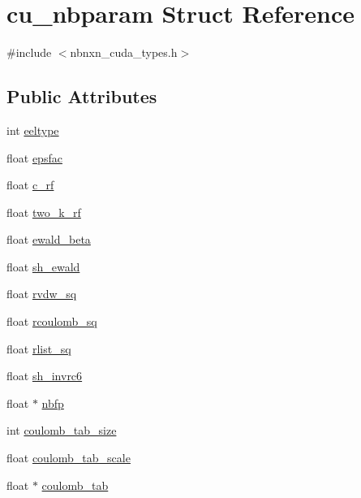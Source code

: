 \hypertarget{structcu__nbparam}{\section{cu\-\_\-nbparam \-Struct \-Reference}
\label{structcu__nbparam}
}


{\ttfamily \#include $<$nbnxn\-\_\-cuda\-\_\-types.\-h$>$}

\subsection*{\-Public \-Attributes}
\begin{DoxyCompactItemize}
\item 
int \hyperlink{structcu__nbparam_a75f63de728565dd8c38d6fbd965c40c1}{eeltype}
\item 
float \hyperlink{structcu__nbparam_ac292245ca6329238cbc936696d644262}{epsfac}
\item 
float \hyperlink{structcu__nbparam_aaf9b3b307c545595165187542d9b7ae2}{c\-\_\-rf}
\item 
float \hyperlink{structcu__nbparam_af7604094cb717320f44ada3be4144fe9}{two\-\_\-k\-\_\-rf}
\item 
float \hyperlink{structcu__nbparam_aaedf0d4f8aa25e039a562bdd5945691f}{ewald\-\_\-beta}
\item 
float \hyperlink{structcu__nbparam_a9aaab36ae7804c9a0f25e482a33559aa}{sh\-\_\-ewald}
\item 
float \hyperlink{structcu__nbparam_a9a9772cd434a3d84e00f113314e5c928}{rvdw\-\_\-sq}
\item 
float \hyperlink{structcu__nbparam_afbd680f8e448d7258319767c9f3331bf}{rcoulomb\-\_\-sq}
\item 
float \hyperlink{structcu__nbparam_a5a77c00d6e0e03714c6970eede8f47d4}{rlist\-\_\-sq}
\item 
float \hyperlink{structcu__nbparam_adddc8466ba4888883c609cccff3be2b6}{sh\-\_\-invrc6}
\item 
float $\ast$ \hyperlink{structcu__nbparam_a906bdb2b60f46ddefc2e34b494056815}{nbfp}
\item 
int \hyperlink{structcu__nbparam_aae7fd01c1f79256496d3ce7d8ca15274}{coulomb\-\_\-tab\-\_\-size}
\item 
float \hyperlink{structcu__nbparam_a758aab743ead1fce2b8038f664d973f3}{coulomb\-\_\-tab\-\_\-scale}
\item 
float $\ast$ \hyperlink{structcu__nbparam_a2231820afdcd8efe6847cfd359c9f159}{coulomb\-\_\-tab}
\end{DoxyCompactItemize}


